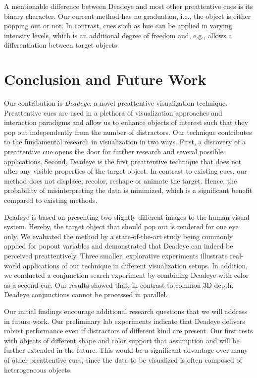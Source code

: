 \documentclass[journal]{vgtc}                %
\begin{document}
A mentionable difference between Deadeye and most other preattentive cues is its binary character. Our current method has no graduation, i.e., the object is either popping out or not. In contrast, cues such as hue can be applied in varying intensity levels, which is an additional degree of freedom and, e.g., allows a differentiation between target objects.


\section{Conclusion and Future Work}

Our contribution is \textit{Deadeye}, a novel preattentive visualization technique. Preattentive cues are used in a plethora of visualization approaches and interaction paradigms and allow us to enhance objects of interest such that they pop out independently from the number of distractors. Our technique contributes to the fundamental research in visualization in two ways. First, a discovery of a preattentive cue opens the door for further research and several possible applications. Second, Deadeye is the first preattentive technique that does not alter any visible properties of the target object. In contrast to existing cues, our method does not displace, recolor, reshape or animate the target. Hence, the probability of misinterpreting the data is minimized, which is a significant benefit compared to existing methods.

Deadeye is based on presenting two slightly different images to the human visual system. Hereby, the target object that should pop out is rendered for one eye only. We evaluated the method by a state-of-the-art study being commonly applied for popout variables and demonstrated that Deadeye can indeed be perceived preattentively. Three smaller, explorative experiments illustrate real-world applications of our technique in different visualization setups. In addition, we conducted a conjunction search experiment by combining Deadeye with color as a second cue. Our results showed that, in contrast to common 3D depth, Deadeye conjunctions cannot be processed in parallel.

Our initial findings encourage additional research questions that we will address in future work. Our preliminary lab experiments indicate that Deadeye delivers robust performance even if distractors of different kind are present. Our first tests with objects of different shape and color support that assumption and will be further extended in the future. This would be a significant advantage over many of other preattentive cues, since the data to be visualized is often composed of heterogeneous objects.
\end{document}
